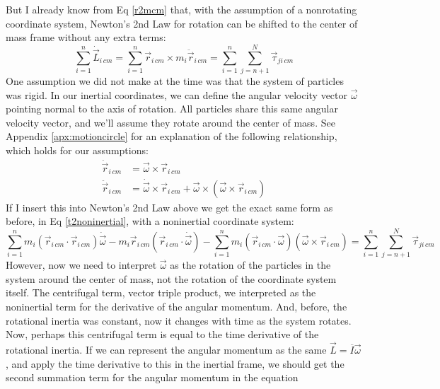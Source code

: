 \documentclass[10pt]{article}
\begin{document}
But I already know from Eq \ref{r2mcm} that, with the assumption of 
a nonrotating coordinate system, Newton's 2nd Law for 
rotation can be shifted to the center of mass frame without 
any extra terms:
\begin{equation*}
    \sum_{i=1}^n \dot{\vec{L}}_{i\,cm} = \sum_{i=1}^n 
        \vec{r}_{i\,cm}\times m_i\ddot{\vec{r}}_{i\,cm} = 
        \sum_{i=1}^n\sum_{j=n+1}^N\vec{\tau}_{ji\,cm}
\end{equation*}
One assumption we did not make at the time was that the system of 
particles was rigid. In our inertial coordinates, we can define 
the angular velocity vector $\vec{\omega}$ pointing normal to the axis of 
rotation. All particles share this same angular velocity vector, 
and we'll assume they rotate around the center of mass. See 
Appendix \ref{apx:motioncircle} 
for an explanation of the following relationship, which 
holds for our assumptions:
\begin{align}
    \dot{\vec{r}}_{i\,cm} &= \vec{\omega}\times\vec{r}_{i\,cm} \label{vcircle}\\
    \ddot{\vec{r}}_{i\,cm} &= \dot{\vec{\omega}}\times\vec{r}_{i\,cm} + 
        \vec{\omega}\times(\vec{\omega}\times\vec{r}_{i\,cm})
\end{align}
If I insert this into Newton's 2nd Law above we get the exact same form as 
before, in Eq \ref{t2noninertial}, with a noninertial coordinate system:
\begin{equation}
    \sum_{i=1}^n 
        m_i(\vec{r}_{i\,cm}\cdot\vec{r}_{i\,cm})\dot{\vec{\omega}} - 
        m_i\vec{r}_{i\,cm}(\vec{r}_{i\,cm}\cdot\dot{\vec{\omega}})-
     \sum_{i=1}^n m_i
        (\vec{r}_{i\,cm}\cdot\vec{\omega})(\vec{\omega}\times\vec{r}_{i\,cm})
        =\sum_{i=1}^n\sum_{j=n+1}^N\vec{\tau}_{ji\,cm}
\end{equation}
However, now we need to 
interpret $\vec{\omega}$ as the rotation of the particles in the 
system around the center of mass, not the rotation of the coordinate 
system itself. The centrifugal term, vector triple product, we 
interpreted as the noninertial term for the derivative of the angular 
momentum. And, before, the rotational inertia was constant, now it changes 
with time as the system rotates. Now, perhaps this centrifugal term is 
equal to the time derivative of the rotational inertia. If we can represent 
the angular momentum as the same $\vec{L} = \overline{I}\vec{\omega}$, and 
apply the time derivative to this in the inertial frame, we should 
get the second summation term for the angular momentum in the equation 
\end{document}
